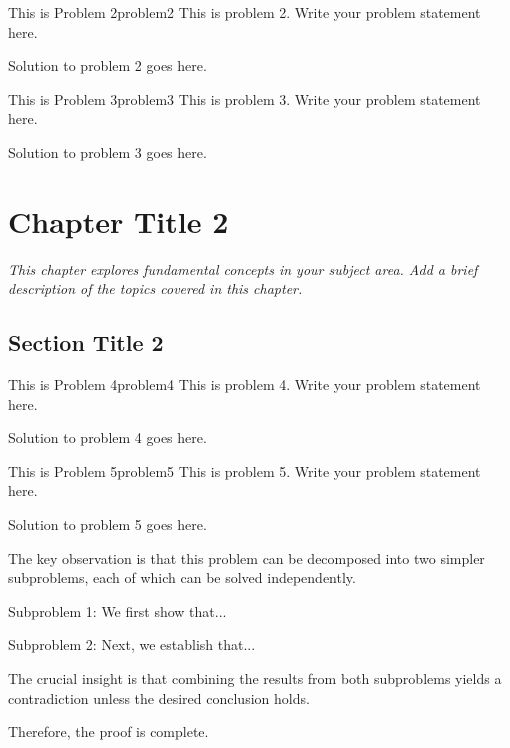 \documentclass[11pt, oneside, openany]{book}
\theoremstyle{definition}
\begin{document}
\begin{problem}{This is Problem 2}{problem2}
    This is problem 2. Write your problem statement here.
\end{problem}
\begin{solution}
    Solution to problem 2 goes here.
\end{solution}

\begin{problem}{This is Problem 3}{problem3}
    This is problem 3. Write your problem statement here.
\end{problem}
\begin{solution}
    Solution to problem 3 goes here.
\end{solution}

\chapter{Chapter Title 2}
\thispagestyle{fancy}

\begin{tcolorbox}[
    enhanced,
    colback=lightgray,
    colframe=darkgray,
    boxrule=0.5pt,
    arc=2pt,
    left=4mm,
    right=4mm,
    top=3mm,
    bottom=3mm
]
\textit{This chapter explores fundamental concepts in your subject area. 
Add a brief description of the topics covered in this chapter.}
\end{tcolorbox}

\section{Section Title 2}

\begin{problem}{This is Problem 4}{problem4}
    This is problem 4. Write your problem statement here.
\end{problem}
\begin{solution}
    Solution to problem 4 goes here.
\end{solution}

\begin{problem}{This is Problem 5}{problem5}
    This is problem 5. Write your problem statement here.
\end{problem}
\begin{solution}
    Solution to problem 5 goes here.
    
    \begin{keyobservation}
        The key observation is that this problem can be decomposed into two simpler subproblems, each of which can be solved independently.
    \end{keyobservation}
    
    Subproblem 1: We first show that...
    
    Subproblem 2: Next, we establish that...
    
    \begin{keyinsight}
        The crucial insight is that combining the results from both subproblems yields a contradiction unless the desired conclusion holds.
    \end{keyinsight}
    
    Therefore, the proof is complete.
\end{solution}
\end{document}
